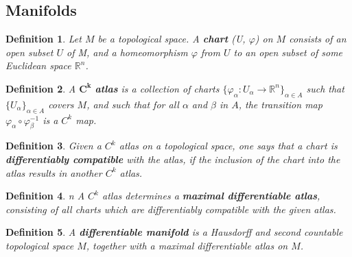 \documentclass[12pt]{article}
\newcommand{\real}{\mathbb{R}}
\newcommand\inv[1]{#1^{-1}}
\newcommand\set[1]{\{#1\}}
\newtheorem{defn}{Definition}[thm]
\begin{document}
\subsection{Manifolds}

\begin{defn}
  Let $M$  be a topological space. A \textbf{chart} (U, $\varphi$) on $M$ consists of an open subset $U$ of M, and a homeomorphism $\varphi$ from $U$ to an open subset of some Euclidean space $\real^n$.
\end{defn}
  
\begin{defn}
  A $\mathbf{C^k}$ \textbf{atlas} is a collection of charts $\set{\varphi_{\alpha} : U_{\alpha} \to  \real^n}_{\alpha \in A}$ such that $\set{U_{\alpha}}_{\alpha \in A}$  covers $M$, and such  that for all  $\alpha$
  and $\beta$ in $A$, the transition map $\varphi_{\alpha} \circ \inv{\varphi_{\beta}}$ is a $C^k$ map.
\end{defn}


\begin{defn}
  Given a $C^k$ atlas on a topological  space, one says that a chart is \textbf{differentiably compatible} with the atlas, if the  inclusion of the chart into the atlas results in another $C^k$  atlas.
\end{defn}
\begin{defn}n
  A $C^k$ atlas determines a \textbf{maximal differentiable atlas}, consisting of all charts which are differentiably compatible with the given atlas.
\end{defn}

\begin{defn}
  A \textbf{differentiable manifold} is a Hausdorff and  second countable topological space  $M$, together  with a maximal differentiable  atlas on $M$.
\end{defn}
\end{document}
